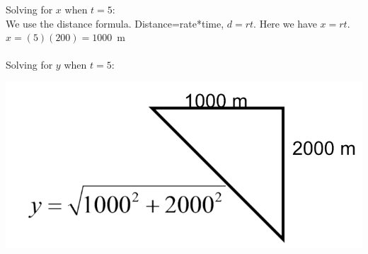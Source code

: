 \documentclass[nooutcomes]{ximera}
\begin{document}
\begin{problem}
\begin{freeResponse}
Solving for $x$ when $t=5$:\\
We use the distance formula.  Distance=rate*time, $d=rt$.  Here we have $x=rt$.  $x=(5)(200)=1000$\ m  \\\\

Solving for $y$ when $t=5$:
	\begin{image}
	\includegraphics[scale=.5]{Figure3.png}
	\end{image}

\end{freeResponse}
\end{problem}
\end{document}

